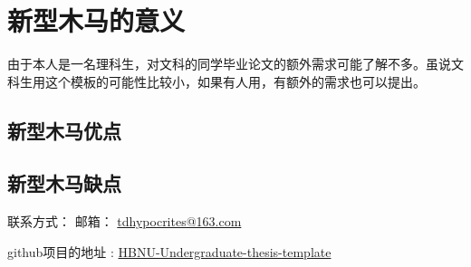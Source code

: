 \section{新型木马的意义}
由于本人是一名理科生，对文科的同学毕业论文的额外需求可能了解不多。虽说文科生用这个模板的可能性比较小，如果有人用，有额外的需求也可以提出。

\subsection{新型木马优点}
\subsection{新型木马缺点}

联系方式：
邮箱： \href{mailto:tdypocrites@163.com}{tdhypocrites@163.com}

github项目的地址 : \href{https://github.com/TDHypocrites/HBNU-Undergraduate-thesis-template}{HBNU-Undergraduate-thesis-template}
